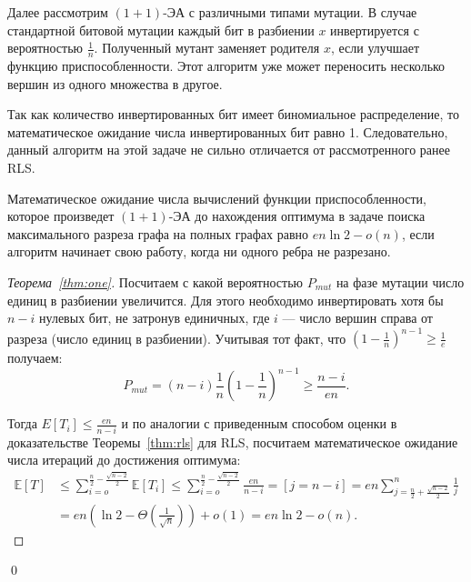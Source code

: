 \documentclass[times]{itmo-student-thesis}
\newcommand{\oea}{\mbox{$(1 + 1)$-ЭА}\xspace}
\begin{document}
Далее рассмотрим \oea с различными типами мутации. В случае стандартной битовой мутации каждый бит в разбиении $x$ инвертируется с вероятностью $\frac{1}{n}$.
Полученный мутант заменяет родителя $x$, если улучшает функцию приспособленности.
Этот алгоритм уже может переносить несколько вершин из одного множества в другое.

Так как количество инвертированных бит имеет биномиальное распределение, то математическое ожидание числа инвертированных бит равно 1.
Следовательно, данный алгоритм на этой задаче не сильно отличается от рассмотренного ранее RLS.

\begin{theorem} \label{thm:one}
  Математическое ожидание числа вычислений функции приспособленности, которое произведет \oea до нахождения оптимума в задаче поиска максимального разреза графа на полных графах равно $en\ln 2 - o(n)$, если алгоритм начинает свою работу, когда ни одного ребра не разрезано.
\end{theorem}

\begin{proof}[Теорема~\ref{thm:one}]
Посчитаем с какой вероятностью $P_{mut}$ на фазе мутации число единиц в разбиении увеличится. Для этого необходимо инвертировать хотя бы $n - i$ нулевых бит, не затронув единичных, где $i$ --- число вершин справа от разреза (число единиц в разбиении).
Учитывая тот факт, что
$ (1 - \frac{1}{n})^{n-1} \ge \frac{1}{e}$
получаем:
$$
  P_{mut} = (n-i)\frac{1}{n}\left(1 - \frac{1}{n}\right)^{n-1} \ge \frac{n-i}{en}.
$$

Тогда $E[T_i] \leq \frac{en}{n-i}$ и по аналогии с приведенным способом оценки в доказательстве Теоремы~\ref{thm:rls} для RLS, посчитаем математическое ожидание числа итераций до достижения оптимума:
\begin{align*}
  \mathbb{E}[T] &\le
              \sum_{i=o}^{\frac{n}{2} - \frac{\sqrt{n-2}}{2}} \mathbb{E}[T_i] \leq
              \sum_{i=o}^{\frac{n}{2} - \frac{\sqrt{n-2}}{2}} \frac{en}{n-i} = [j = n - i] = en \sum_{j=\frac{n}{2} + \frac{\sqrt{n-2}}{2}}^{n} \frac{1}{j}  \\
      &=
              en\left(\ln2 - \Theta\left(\frac{1}{\sqrt{n}}\right)\right) + o(1) = en \ln2 - o(n).
\end{align*}
\end{proof}\qed
\end{document}
